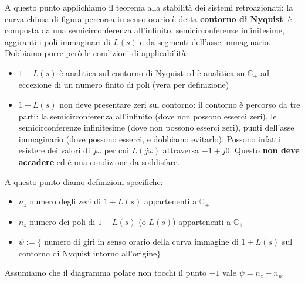 \documentclass[11pt]{article}
\begin{document}
A questo punto applichiamo il teorema alla stabilità dei sistemi retroazionati: la curva chiusa di figura percorsa in senso orario è detta \textbf{contorno di Nyquist}: è composta da una semicirconferenza all'infinito, semicirconferenze infinitesime, aggiranti i poli immaginari di $L(s)$ e da segmenti dell'asse immaginario. Dobbiamo porre però le condizioni di applicabilità:
\begin{itemize}
    \item $1+L(s)$ è analitica sul contorno di Nyquist ed è analitica su $\mathbb{C}_+$ ad eccezione di un numero finito di poli (vera per definizione)
    \item $1+L(s)$ non deve presentare zeri sul contorno: il contorno è percorso da tre parti: la semicirconferenza all'infinito (dove non possono esserci zeri), le semicirconferenze infinitesime (dove non possono esserci zeri), punti dell'asse immaginario (dove possono esserci, e dobbiamo evitarlo). Possono infatti esistere dei valori di $j\omega$ per cui $L(j\omega)$ attraversa $-1+j0$. Questo \textbf{non deve accadere} ed è una condizione da soddisfare.
\end{itemize}
A questo punto diamo definizioni specifiche:
\begin{itemize}
    \item $n_z$ numero degli zeri di $1+L(s)$ appartenenti a $\mathbb{C}_+$
    \item $n_z$ numero dei poli di $1+L(s)$ (o $L(s)$) appartenenti a $\mathbb{C}_+$
    \item $\psi := \{$ numero di giri in senso orario della curva immagine di $1+L(s)$ sul contorno di Nyquist intorno all'origine$\}$

\end{itemize}

Assumiamo che il diagramma polare non tocchi il punto $-1$ vale $\psi=n_z-n_p$.
\end{document}

